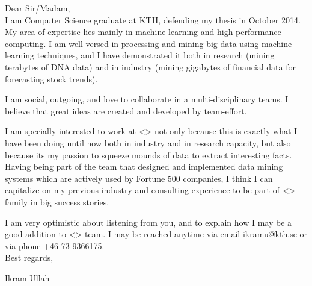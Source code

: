 \documentclass[margin, 10pt] {report}
\begin{document}
\noindent
Dear Sir/Madam, \\

\noindent
I am Computer Science graduate at KTH, defending my thesis in October 2014. My area of expertise lies mainly in machine learning and high performance computing. I am well-versed in processing and mining big-data using machine learning techniques, and I have demonstrated it both in research (mining terabytes of DNA data) and in industry (mining gigabytes of financial data for forecasting stock trends).

\noindent
I am social, outgoing, and love to collaborate in a multi-disciplinary teams. I believe that great ideas are created and developed by team-effort.

\noindent
I am specially interested to work at <> not only because this is exactly what I have been doing until now both in industry and in research capacity, but also because its my passion to squeeze mounds of data to extract interesting facts. Having being part of the team that designed and implemented data mining systems which are actively used by Fortune 500 companies, I think I can capitalize on my previous industry and consulting experience to be part of <> family in big success stories.

\noindent
I am very optimistic about listening from you, and to explain how I may be a good addition to <> team. I may be reached anytime via email \url{ikramu@kth.se} or via phone +46-73-9366175. \\

\noindent
Best regards, 

\noindent
Ikram Ullah
\end{document}
